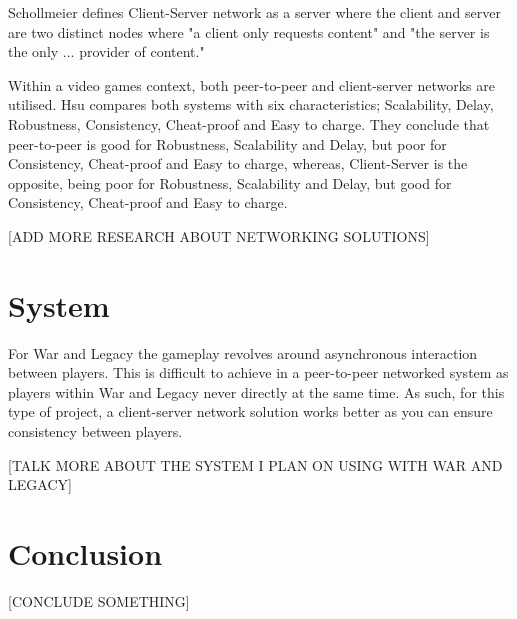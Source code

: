 \documentclass{article}
\begin{document}
Schollmeier defines Client-Server network as a server where the client and server are two distinct nodes where "a client only requests content" and "the server is the only ... provider of content."

Within a video games context, both peer-to-peer and client-server networks are utilised. Hsu compares both systems\cite{hsu2003} with six characteristics; Scalability, Delay, Robustness, Consistency, Cheat-proof and Easy to charge. They conclude that peer-to-peer is good for Robustness, Scalability and Delay, but poor for Consistency, Cheat-proof and Easy to charge, whereas, Client-Server is the opposite, being poor for Robustness, Scalability and Delay, but good for Consistency, Cheat-proof and Easy to charge.

[ADD MORE RESEARCH ABOUT NETWORKING SOLUTIONS]

\section{System}
For War and Legacy the gameplay revolves around asynchronous interaction between players. This is difficult to achieve in a peer-to-peer networked system as players within War and Legacy never directly at the same time. As such, for this type of project, a client-server network solution works better as you can ensure consistency between players.

[TALK MORE ABOUT THE SYSTEM I PLAN ON USING WITH WAR AND LEGACY]

\section{Conclusion}
[CONCLUDE SOMETHING]


\printbibliography[filter=papers]
\printbibliography[type=software, title={Games}]

\listoffigures
\end{document}
